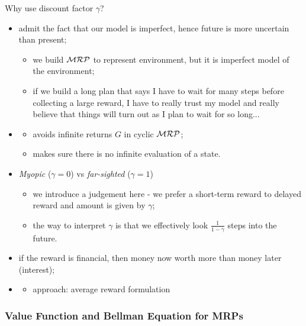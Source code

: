 \begin{notebox}
Why use discount factor $\gamma$?
\begin{itemize}
	\item admit the fact that our model is imperfect, hence future is more uncertain than present;
	\begin{itemize}
		\item we build $\mathcal{MRP}$ to represent environment, but it is imperfect model of the environment;
		\item if we build a long plan that says I have to wait for many steps before collecting a large reward, I have to really trust my model and really believe that things will turn out as I plan to wait for so long...
	\end{itemize} 
	\item {}
	\begin{itemize}
		\item avoids infinite returns $G$ in cyclic $\mathcal{MRP}$;
		\item makes sure there is no infinite evaluation of a state.
	\end{itemize}
	\item \textit{Myopic} ($\gamma=0$) vs \textit{far-sighted} ($\gamma=1$)
	\begin{itemize}
		\item we introduce a judgement here - we prefer a short-term reward to delayed reward and amount is given by $\gamma$;
		\item the way to interpret $\gamma$ is that we effectively look $\frac{1}{1-\gamma}$ steps into the future.
	\end{itemize}
	\item if the reward is financial, then money now worth more than money later (interest);
	\item {}
	\begin{itemize}
		\item approach: average reward formulation
	\end{itemize}
\end{itemize}
\end{notebox}

\subsubsection{Value Function and Bellman Equation for MRPs}

